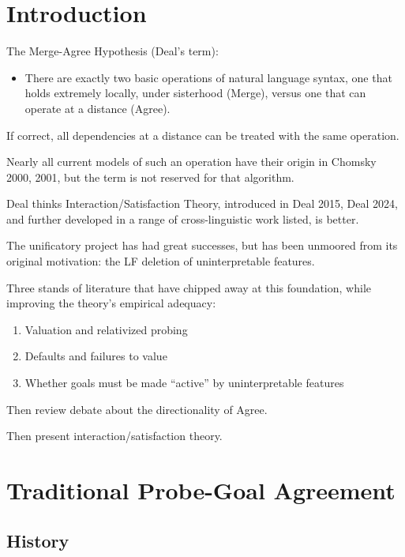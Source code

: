 \section*{Introduction}

The Merge-Agree Hypothesis (Deal's term):

\begin{itemize}
  \item There are exactly two basic operations of natural language syntax, one that holds extremely locally, under sisterhood (Merge), versus one that can operate at a distance (Agree).
\end{itemize}

If correct, all dependencies at a distance can be treated with the same operation.

Nearly all current models of such an operation have their origin in Chomsky 2000, 2001, but the term is not reserved for that algorithm.

Deal thinks Interaction/Satisfaction Theory, introduced in Deal 2015, Deal 2024, and further developed in a range of cross-linguistic work listed, is better.

The unificatory project has had great successes, but has been unmoored from its original motivation: the LF deletion of uninterpretable features.

Three stands of literature that have chipped away at this foundation, while improving the theory's empirical adequacy:

\begin{enumerate}
  \item Valuation and relativized probing
  \item Defaults and failures to value
  \item Whether goals must be made ``active'' by uninterpretable features
\end{enumerate}

Then review debate about the directionality of Agree.

Then present interaction/satisfaction theory.

\section*{Traditional Probe-Goal Agreement}

\subsection*{History}

